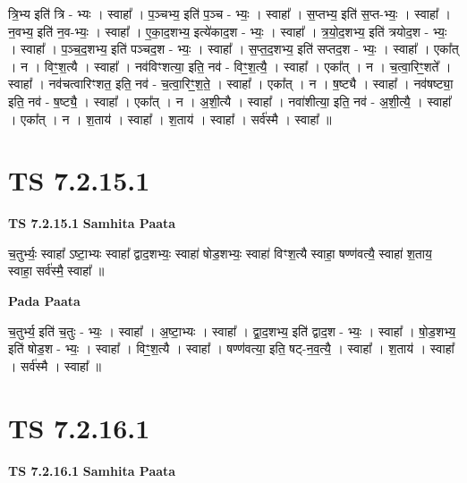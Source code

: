 \documentclass[17pt]{extarticle}
\begin{document}
त्रि॒भ्य इति॑ त्रि - भ्यः । स्वाहा᳚ । प॒ञ्चभ्य॒ इति॑ प॒ञ्च - भ्यः॒ । स्वाहा᳚ । स॒प्तभ्य॒ इति॑ स॒प्त-भ्यः॒ । स्वाहा᳚ । न॒वभ्य॒ इति॑ न॒व-भ्यः॒ । स्वाहा᳚ । ए॒का॒द॒शभ्य॒ इत्ये॑काद॒श - भ्यः॒ । स्वाहा᳚ । त्र॒यो॒द॒शभ्य॒ इति॑ त्रयोद॒श - भ्यः॒ । स्वाहा᳚ । प॒ञ्च॒द॒शभ्य॒ इति॑ पञ्चद॒श - भ्यः॒ । स्वाहा᳚ । स॒प्त॒द॒शभ्य॒ इति॑ सप्तद॒श - भ्यः॒ । स्वाहा᳚ । एका᳚त् । न । विꣳ॒॒श॒त्यै । स्वाहा᳚ । नव॑विꣳशत्या॒ इति॒ नव॑ - विꣳ॒॒श॒त्यै॒ । स्वाहा᳚ । एका᳚त् । न । च॒त्वा॒रिꣳ॒॒शते᳚ । स्वाहा᳚ । नव॑चत्वारिꣳशत॒ इति॒ नव॑ - च॒त्वा॒रिꣳ॒॒श॒ते॒ । स्वाहा᳚ । एका᳚त् । न । ष॒ष्ट्यै । स्वाहा᳚ । नव॑षष्ट्या॒ इति॒ नव॑ - ष॒ष्ट्यै॒ । स्वाहा᳚ । एका᳚त् । न । अ॒शी॒त्यै । स्वाहा᳚ । नवा॑शीत्या॒ इति॒ नव॑ - अ॒शी॒त्यै॒ । स्वाहा᳚ । एका᳚त् । न । श॒ताय॑ । स्वाहा᳚ । श॒ताय॑ । स्वाहा᳚ । सर्व॑स्मै । स्वाहा᳚ ॥  \newline




\section*{ TS 7.2.15.1 }

\textbf{TS 7.2.15.1 } \newline
\textbf{Samhita Paata} \newline

च॒तुर्भ्यः॒ स्वाहा᳚ ऽष्टा॒भ्यः स्वाहा᳚ द्वाद॒शभ्यः॒ स्वाहा॑ षोड॒शभ्यः॒ स्वाहा॑ विꣳश॒त्यै स्वाहा॒ षण्ण॑वत्यै॒ स्वाहा॑ श॒ताय॒ स्वाहा॒ सर्व॑स्मै॒ स्वाहा᳚ ॥ \newline

\textbf{Pada Paata} \newline

च॒तुर्भ्य॒ इति॑ च॒तुः - भ्यः॒ । स्वाहा᳚ । अ॒ष्टा॒भ्यः । स्वाहा᳚ । द्वा॒द॒शभ्य॒ इति॑ द्वाद॒श - भ्यः॒ । स्वाहा᳚ । षो॒ड॒शभ्य॒ इति॑ षोड॒श - भ्यः॒ । स्वाहा᳚ । विꣳ॒॒श॒त्यै । स्वाहा᳚ । षण्ण॑वत्या॒ इति॒ षट्-न॒व॒त्यै॒ । स्वाहा᳚ । श॒ताय॑ । स्वाहा᳚ । सर्व॑स्मै । स्वाहा᳚ ॥  \newline




\section*{ TS 7.2.16.1 }

\textbf{TS 7.2.16.1 } \newline
\textbf{Samhita Paata} \newline
\end{document}
